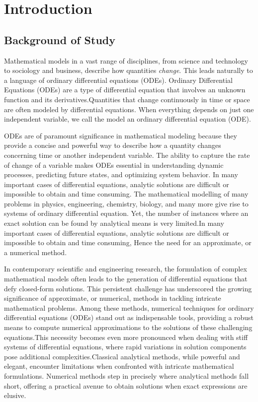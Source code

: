 \setlength{\headheight}{14.49998pt}
\addtolength{\topmargin}{-2.49998pt}

\chapter{Introduction}



\section{Background of Study}
Mathematical models in a vast range of disciplines, from science and technology to sociology and business, describe how quantities \textsl{change}. This leads naturally to a language of ordinary differential equations (ODEs).
Ordinary Differential Equations (ODEs) are a type of differential equation that involves an unknown function and its derivatives.Quantities that change continuously in time or space are often modeled by differential equations. When everything depends on just one independent variable, we call the model an ordinary differential equation (ODE)\cite{fnc_multistep_methods}.

ODEs are of paramount significance in mathematical modeling because they provide a concise and powerful way to describe how a quantity changes concerning time or another independent variable. The ability to capture the rate of change of a variable makes ODEs essential in understanding dynamic processes, predicting future states, and optimizing system behavior.
In many important cases of differential equations, analytic solutions are difficult or impossible to obtain and time
consuming.
The mathematical modelling of many problems in physics, engineering, chemistry, biology, and many more give rise to systems of ordinary differential equation. Yet, the number of instances where an exact solution can be found by analytical means is very limited\cite{lambert1977}.In many important cases of differential equations, analytic solutions are difficult or impossible to obtain and time
consuming, Hence the need for an approximate, or a numerical method.

In contemporary scientific and engineering research, the formulation of complex mathematical models often leads to the generation of differential equations that defy closed-form solutions. This persistent challenge has underscored the growing significance of approximate, or numerical, methods in tackling intricate mathematical problems. Among these methods, numerical techniques for ordinary differential equations (ODEs) stand out as indispensable tools, providing a robust means to compute numerical approximations to the solutions of these challenging equations.This necessity becomes even more pronounced when dealing with stiff systems of differential equations, where rapid variations in solution components pose additional complexities.Classical analytical methods, while powerful and elegant, encounter limitations when confronted with intricate mathematical formulations. Numerical methods step in precisely where analytical methods fall short, offering a practical avenue to obtain solutions when exact expressions are elusive.

